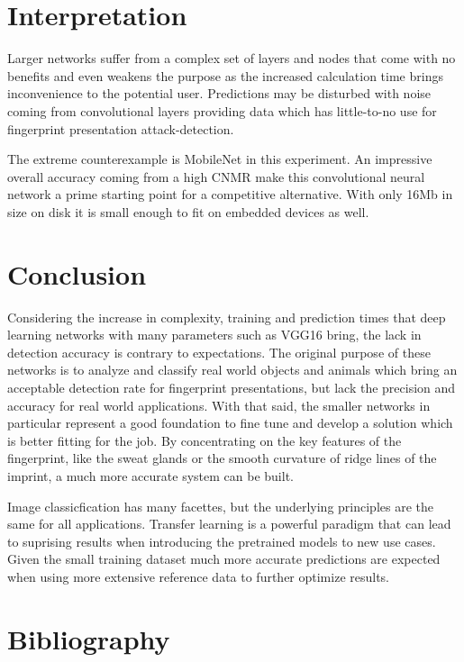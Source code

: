 \section{Interpretation}
Larger networks suffer from a complex set of layers and nodes that come with no benefits and even weakens the purpose as the increased calculation time brings inconvenience to the potential user.
Predictions may be disturbed with noise coming from convolutional layers providing data which has little-to-no use for fingerprint presentation attack-detection.

\medskip\noindent
The extreme counterexample is MobileNet in this experiment.
An impressive overall accuracy coming from a high CNMR make this convolutional neural network a prime starting point for a competitive alternative.
With only 16Mb in size on disk it is small enough to fit on embedded devices as well.


\section{Conclusion}
Considering the increase in complexity, training and prediction times that deep learning networks with many parameters such as VGG16 bring, the lack in detection accuracy is contrary to expectations.
The original purpose of these networks is to analyze and classify real world objects and animals which bring an acceptable detection rate for fingerprint presentations, but lack the precision and accuracy for real world applications.
With that said, the smaller networks in particular represent a good foundation to fine tune and develop a solution which is better fitting for the job.
By concentrating on the key features of the fingerprint, like the sweat glands or the smooth curvature of ridge lines of the imprint, a much more accurate system can be built.

\medskip\noindent
Image classicfication has many facettes, but the underlying principles are the same for all applications.
Transfer learning is a powerful paradigm that can lead to suprising results when introducing the pretrained models to new use cases.
Given the small training dataset much more accurate predictions are expected when using more extensive reference data to further optimize results.


\section{Bibliography}